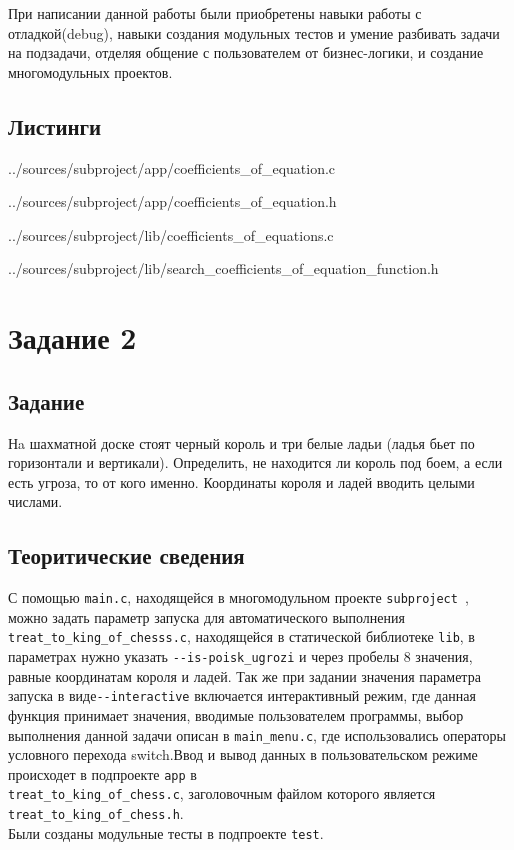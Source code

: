 \documentclass[12pt,a4paper]{report}
\begin{document}
При написании данной работы были приобретены навыки работы с отладкой(debug), навыки создания модульных тестов и умение разбивать задачи на подзадачи, отделяя общение с пользователем от бизнес-логики, и создание многомодульных проектов. 

\subsection*{Листинги}


{../sources/subproject/app/coefficients_of_equation.c}


{../sources/subproject/app/coefficients_of_equation.h}


{../sources/subproject/lib/coefficients_of_equations.c}


{../sources/subproject/lib/search_coefficients_of_equation_function.h}



\section{Задание 2}
\subsection{Задание}
Нa шахматной доске стоят черный король и три белые ладьи (ладья бьет по горизонтали и вертикали). Определить, не находится ли король под боем, а если есть угроза, то от кого именно. Координаты короля и ладей вводить целыми числами.
\subsection{Теоритические сведения}
С помощью \verb+main.c+, находящейся в многомодульном проекте \verb+subproject +, можно задать параметр запуска для автоматического выполнения\\ 
\verb+treat_to_king_of_chesss.c+, находящейся в статической библиотеке \verb+lib+, в параметрах нужно указать 
\verb+--is-poisk_ugrozi+ и через пробелы 8 значения, равные координатам короля и ладей. Так же при задании значения параметра запуска в виде\verb+--interactive+ включается интерактивный режим, где данная функция принимает значения, вводимые пользователем программы, выбор выполнения данной задачи описан в \verb+main_menu.c+, где использовались операторы условного перехода switch.Ввод и вывод данных в пользовательском режиме происходет в подпроекте \verb+app+ в \\
\verb+treat_to_king_of_chess.c+, заголовочным файлом которого является\\ \verb+treat_to_king_of_chess.h+. \\ 
Были созданы модульные тесты в подпроекте \verb+test+. 
\end{document}
